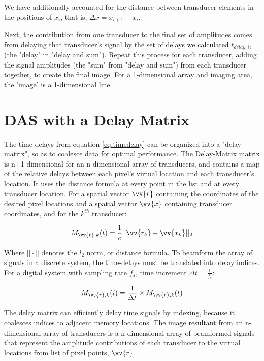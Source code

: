     We have additionally accounted for the distance between transducer elements in the positions of $x_i$, that is, $\Delta{x} = x_{i+1} - x_i$.

    Next, the contribution from one transducer to the final set of amplitudes comes from delaying that transducer's signal by the set of delays we calculated $t_{delay,i}$, (the "delay" in "delay and sum"). Repeat this process for each transducer, adding the signal amplitudes (the "sum" from "delay and sum") from each transducer together, to create the final image. For a 1-dimensional array and imaging area, the 'image' is a 1-dimensional line.

\section{DAS with a Delay Matrix}
\label{chapter2:delay_matrix}

    The time delays from equation \ref{eq:timedelay} can be organized into a "delay matrix", so as to coalesce data for optimal performance. The Delay-Matrix matrix is n+1-dimensional for an n-dimensional array of transducers, and contains a map of the relative delays between each pixel's virtual location and each transducer's location. It uses the distance formula at every point in the list and at every transducer location. For a spatial vector $\vv{r}$ containing the coordinates of the desired pixel locations and a spatial vector $\vv{x}$ containing transducer coordinates, and for the $k^{th}$ transducer: 

    \begin{equation}
        M_{\vv{r},k}(t) = \frac{1}{c} || \vv{r_k} - \vv{x_k}||_2
    \end{equation}

    Where $||\cdot||$ denotes the $l_2$ norm, or distance formula. To beamform the array of signals in a discrete system, the time-delays must be translated into delay indices. For a digital system with sampling rate $f_s$, time increment $\Delta{t} = \frac{1}{f_s}$:

    \begin{equation}
        M_{\vv{r},k}(i) = \frac{1}{\Delta{t}} \times M_{\vv{r},k}(t)    
    \end{equation}

    The delay matrix can efficiently delay time signals by indexing, because it coalesces indices to adjacent memory locations. The image resultant from an n-dimensional array of transducers is a n-dimensional array of beamformed signals that represent the amplitude contributions of each transducer to the virtual locations from list of pixel points, $\vv{r}$.

